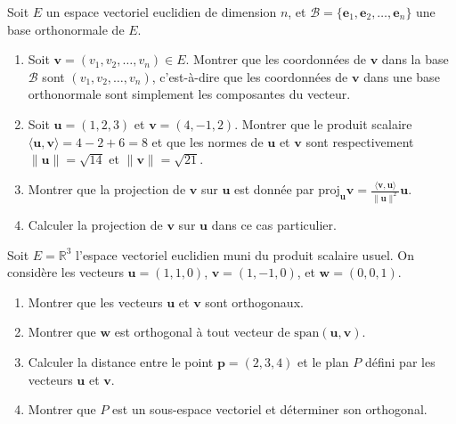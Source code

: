 \begin{exercice}
Soit \( E \) un espace vectoriel euclidien de dimension \( n \), et \( \mathcal{B} = \{ \mathbf{e}_1, \mathbf{e}_2, \dots, \mathbf{e}_n \} \) une base orthonormale de \( E \).

\begin{enumerate}
    \item Soit \( \mathbf{v} = (v_1, v_2, \dots, v_n) \in E \). Montrer que les coordonnées de \( \mathbf{v} \) dans la base \( \mathcal{B} \) sont \( (v_1, v_2, \dots, v_n) \), c'est-à-dire que les coordonnées de \( \mathbf{v} \) dans une base orthonormale sont simplement les composantes du vecteur.
    \item Soit \( \mathbf{u} = (1, 2, 3) \) et \( \mathbf{v} = (4, -1, 2) \). Montrer que le produit scalaire \( \langle \mathbf{u}, \mathbf{v} \rangle = 4 - 2 + 6 = 8 \) et que les normes de \( \mathbf{u} \) et \( \mathbf{v} \) sont respectivement \( \| \mathbf{u} \| = \sqrt{14} \) et \( \| \mathbf{v} \| = \sqrt{21} \).
    \item Montrer que la projection de \( \mathbf{v} \) sur \( \mathbf{u} \) est donnée par \( \text{proj}_{\mathbf{u}} \mathbf{v} = \frac{\langle \mathbf{v}, \mathbf{u} \rangle}{\| \mathbf{u} \|^2} \mathbf{u} \).
    \item Calculer la projection de \( \mathbf{v} \) sur \( \mathbf{u} \) dans ce cas particulier.
\end{enumerate}
\end{exercice}

\begin{exercice}
Soit \( E = \mathbb{R}^3 \) l'espace vectoriel euclidien muni du produit scalaire usuel. On considère les vecteurs \( \mathbf{u} = (1, 1, 0) \), \( \mathbf{v} = (1, -1, 0) \), et \( \mathbf{w} = (0, 0, 1) \).

\begin{enumerate}
    \item Montrer que les vecteurs \( \mathbf{u} \) et \( \mathbf{v} \) sont orthogonaux.
    \item Montrer que \( \mathbf{w} \) est orthogonal à tout vecteur de \( \text{span}(\mathbf{u}, \mathbf{v}) \).
    \item Calculer la distance entre le point \( \mathbf{p} = (2, 3, 4) \) et le plan \( P \) défini par les vecteurs \( \mathbf{u} \) et \( \mathbf{v} \).
    \item Montrer que \( P \) est un sous-espace vectoriel et déterminer son orthogonal.
\end{enumerate}
\end{exercice}

